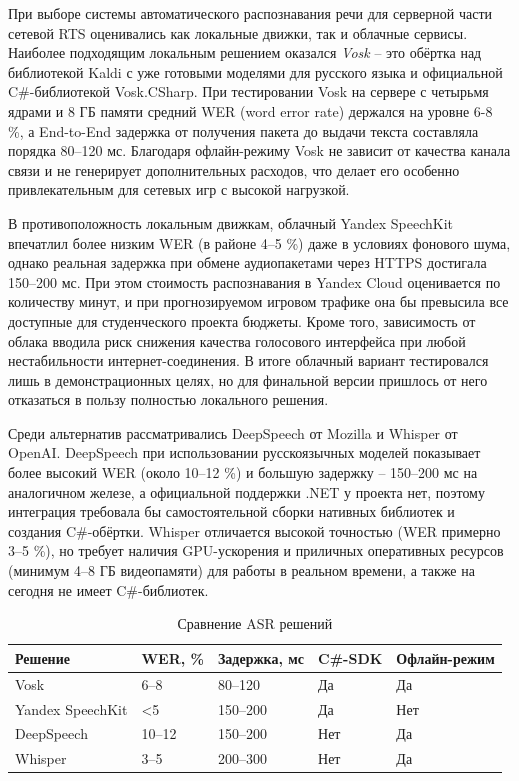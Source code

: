         При выборе системы автоматического распознавания речи для серверной части сетевой RTS оценивались как локальные движки, так и облачные сервисы. Наиболее подходящим локальным решением оказался 
        \textit{Vosk} -- это обёртка над библиотекой Kaldi с уже готовыми моделями для русского языка и официальной C\#-библиотекой Vosk.CSharp. При тестировании Vosk на сервере с четырьмя ядрами и 8 ГБ 
        памяти средний WER (word error rate) держался на уровне 6-8 \%, а End-to-End задержка от получения пакета до выдачи текста 
        состав­ляла порядка 80–120 мс. Благодаря офлайн-режиму Vosk не зависит от качества канала связи и не генерирует дополнительных расходов, что делает его особенно привлекательным для 
        сетевых игр с высокой нагрузкой.

        В противоположность локальным движкам, облачный Yandex SpeechKit впечатлил более низким WER (в районе 4–5 \%) даже в условиях фонового шума, однако реальная задержка при обмене
        аудиопакетами через HTTPS достигала 150–200 мс. При этом стоимость распознавания в Yandex Cloud оценивается по количеству минут, и при прогнозируемом игровом трафике она бы превысила
        все доступные для студенческого проекта бюджеты. Кроме того, зависимость от облака вводила риск снижения качества голосового интерфейса при любой нестабильности интернет-соединения. 
        В итоге облачный вариант тестировался лишь в демонстрационных целях, но для финальной версии пришлось от него отказаться в пользу полностью локального решения.

        Среди альтернатив рассматривались DeepSpeech от Mozilla и Whisper от OpenAI. DeepSpeech при использовании русскоязычных моделей показывает более высокий WER (около 10–12 \%) и большую 
        задержку -- 150–200 мс на аналогичном железе, а официальной поддержки .NET у проекта нет, поэтому интеграция требовала бы самостоятельной сборки нативных библиотек и создания C\#-обёртки. 
        Whisper отличается высокой точностью (WER примерно 3–5 \%), но требует наличия GPU-ускорения и приличных оперативных ресурсов (минимум 4–8 ГБ видеопамяти) для работы в реальном времени, 
        а также на сегодня не имеет C\#-библиотек.


        \begin{table}[ht]
            \caption{Сравнение ASR решений}
            \centering
            \renewcommand{\arraystretch}{1.2}
            \renewcommand{\tablename}{Табл.}
            \begin{tabularx}{\textwidth}{|X|X|X|X|X|}
            \hline
            \textbf{Решение} & \textbf{WER, \%} & \textbf{Задержка, мс} & \textbf{C\#-SDK} & \textbf{Офлайн-режим} \\
            \hline
            Vosk&6–8&80–120&Да&Да \\
            \hline
            Yandex SpeechKit&<5&150–200&Да&Нет \\
            \hline
            DeepSpeech&10–12&150–200&Нет&Да\\
            \hline
            Whisper&3–5&200–300&Нет&Да\\
            \hline
            \end{tabularx}
        \end{table}

